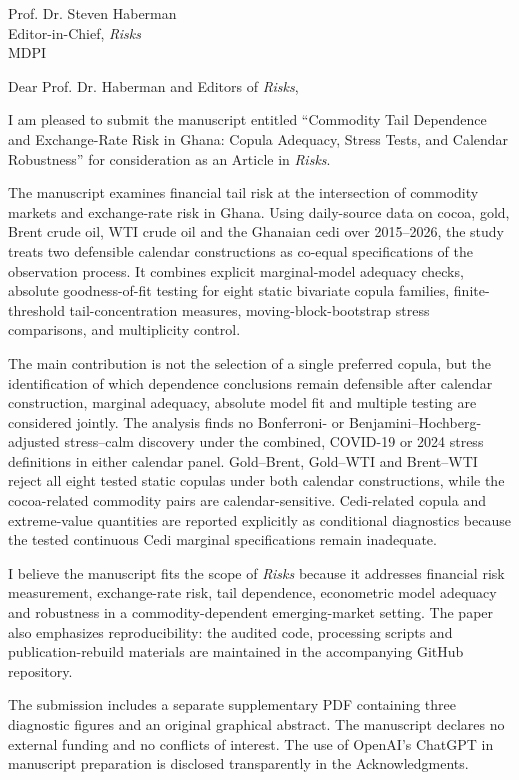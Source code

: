 \documentclass[11pt,a4paper]{letter}
\date{\today}
\begin{document}
\begin{letter}{Prof. Dr. Steven Haberman\\Editor-in-Chief, \textit{Risks}\\MDPI}
\opening{Dear Prof. Dr. Haberman and Editors of \textit{Risks},}

I am pleased to submit the manuscript entitled ``Commodity Tail Dependence and Exchange-Rate Risk in Ghana: Copula Adequacy, Stress Tests, and Calendar Robustness'' for consideration as an Article in \textit{Risks}.

The manuscript examines financial tail risk at the intersection of commodity markets and exchange-rate risk in Ghana. Using daily-source data on cocoa, gold, Brent crude oil, WTI crude oil and the Ghanaian cedi over 2015--2026, the study treats two defensible calendar constructions as co-equal specifications of the observation process. It combines explicit marginal-model adequacy checks, absolute goodness-of-fit testing for eight static bivariate copula families, finite-threshold tail-concentration measures, moving-block-bootstrap stress comparisons, and multiplicity control.

The main contribution is not the selection of a single preferred copula, but the identification of which dependence conclusions remain defensible after calendar construction, marginal adequacy, absolute model fit and multiple testing are considered jointly. The analysis finds no Bonferroni- or Benjamini--Hochberg-adjusted stress--calm discovery under the combined, COVID-19 or 2024 stress definitions in either calendar panel. Gold--Brent, Gold--WTI and Brent--WTI reject all eight tested static copulas under both calendar constructions, while the cocoa-related commodity pairs are calendar-sensitive. Cedi-related copula and extreme-value quantities are reported explicitly as conditional diagnostics because the tested continuous Cedi marginal specifications remain inadequate.

I believe the manuscript fits the scope of \textit{Risks} because it addresses financial risk measurement, exchange-rate risk, tail dependence, econometric model adequacy and robustness in a commodity-dependent emerging-market setting. The paper also emphasizes reproducibility: the audited code, processing scripts and publication-rebuild materials are maintained in the accompanying GitHub repository.

The submission includes a separate supplementary PDF containing three diagnostic figures and an original graphical abstract. The manuscript declares no external funding and no conflicts of interest. The use of OpenAI's ChatGPT in manuscript preparation is disclosed transparently in the Acknowledgments.


\end{letter}
\end{document}
